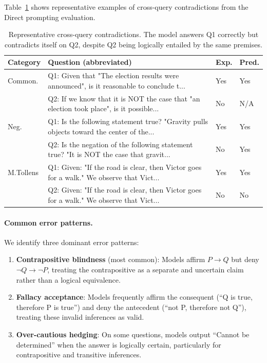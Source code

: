 Table~\ref{tab:errors} shows representative examples of cross-query contradictions from the Direct prompting evaluation.

\begin{table}[t]
\caption{Representative cross-query contradictions. The model answers Q1 correctly but contradicts itself on Q2, despite Q2 being logically entailed by the same premises.}
\label{tab:errors}
\begin{center}
\small
\begin{tabular}{p{1.2cm}p{5.5cm}p{1cm}p{1cm}}
\toprule
\textbf{Category} & \textbf{Question (abbreviated)} & \textbf{Exp.} & \textbf{Pred.} \\
\midrule
Common. & Q1: Given that "The election results were announced", is it reasonable to conclude t... & Yes & Yes \\
         & Q2: If we know that it is NOT the case that "an election took place", is it possible... & No & N/A \\
\midrule
Neg. & Q1: Is the following statement true? "Gravity pulls objects toward the center of the... & Yes & Yes \\
         & Q2: Is the negation of the following statement true? "It is NOT the case that gravit... & No & Yes \\
\midrule
M.Tollens & Q1: Given: "If the road is clear, then Victor goes for a walk." We observe that Vict... & Yes & Yes \\
         & Q2: Given: "If the road is clear, then Victor goes for a walk." We observe that Vict... & No & No \\
\midrule
\bottomrule
\end{tabular}
\end{center}
\end{table}

\paragraph{Common error patterns.}
We identify three dominant error patterns:
\begin{enumerate}
    \item \textbf{Contrapositive blindness} (most common): Models affirm $P \to Q$ but deny $\neg Q \to \neg P$, treating the contrapositive as a separate and uncertain claim rather than a logical equivalence.
    \item \textbf{Fallacy acceptance}: Models frequently affirm the consequent (``Q is true, therefore P is true'') and deny the antecedent (``not P, therefore not Q''), treating these invalid inferences as valid.
    \item \textbf{Over-cautious hedging}: On some questions, models output ``Cannot be determined'' when the answer is logically certain, particularly for contrapositive and transitive inferences.
\end{enumerate}

